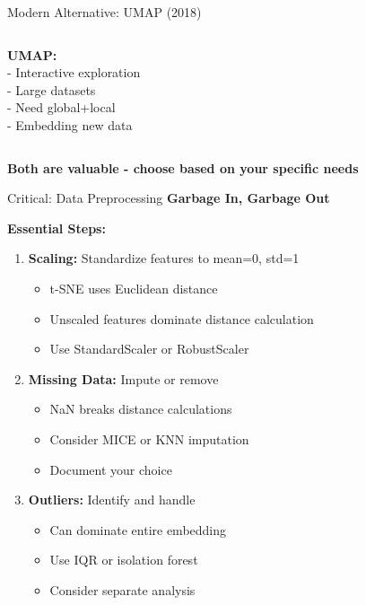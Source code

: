 \documentclass[10pt]{beamer}
\newcommand{\emphtext}[1]{\textcolor{upcblue}{\textbf{#1}}}
\newcommand{\warningbox}[1]{\colorbox{red!10}{\begin{minipage}{0.85\textwidth}\centering #1\end{minipage}}}
\begin{document}
\begin{frame}{Modern Alternative: UMAP (2018)}
\begin{columns}[T]
\begin{column}{0.48\textwidth}
\footnotesize
\textbf{UMAP:}\\
- Interactive exploration\\
- Large datasets\\
- Need global+local\\
- Embedding new data
\end{column}
\end{columns}

\begin{center}
\warningbox{\footnotesize\textbf{Both are valuable - choose based on your specific needs}}
\end{center}
\end{frame}

\begin{frame}{Critical: Data Preprocessing}
\emphtext{Garbage In, Garbage Out}

\vspace{0.3cm}
\textbf{Essential Steps:}

\begin{enumerate}
\footnotesize
\item \textbf{Scaling:} Standardize features to mean=0, std=1
   \begin{itemize}
   \tiny
   \item t-SNE uses Euclidean distance
   \item Unscaled features dominate distance calculation
   \item Use StandardScaler or RobustScaler
   \end{itemize}

\item \textbf{Missing Data:} Impute or remove
   \begin{itemize}
   \tiny
   \item NaN breaks distance calculations
   \item Consider MICE or KNN imputation
   \item Document your choice
   \end{itemize}

\item \textbf{Outliers:} Identify and handle
   \begin{itemize}
   \tiny
   \item Can dominate entire embedding
   \item Use IQR or isolation forest
   \item Consider separate analysis
   \end{itemize}


\end{enumerate}
\end{frame}
\end{document}

